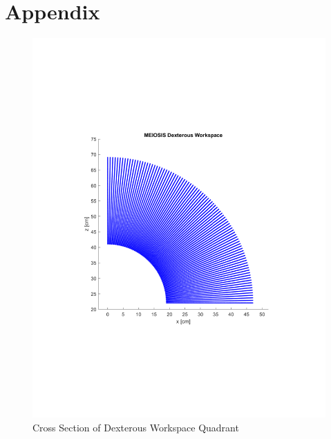 \documentclass[12pt]{report}
\renewcommand\thesection{\arabic{section}}
\begin{document}
\newpage
\appendix
\renewcommand\thesection{\Roman{section}}
\renewcommand\thesubsection{\roman{subsection}}
\section*{Appendix}\label{sec:app}
\begin{figure}[htp]
  \centering
  \includegraphics[frame,width=.75\textwidth]{dex}
  \caption{Cross Section of Dexterous Workspace Quadrant}
  \label{fig:dex}
\end{figure}

\newpage


\end{document}
